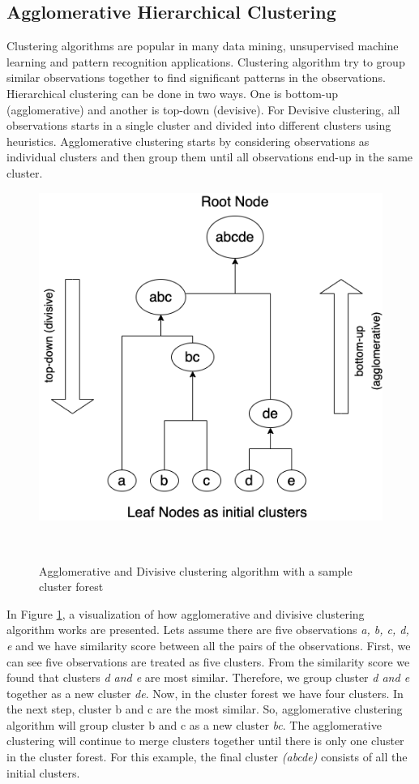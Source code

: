 \subsection{Agglomerative Hierarchical Clustering}
Clustering algorithms are popular in many data mining, unsupervised machine learning and pattern recognition applications. Clustering algorithm try to group similar observations together to find significant patterns in the observations. Hierarchical clustering can be done in two ways. One is bottom-up (agglomerative) and another is top-down (devisive). For Devisive clustering, all observations starts in a single cluster and divided into different clusters using heuristics. Agglomerative clustering starts by considering observations as individual clusters and then group them until all observations end-up in the same cluster.

\begin{figure}[h]
  \centering
  \includegraphics[width=0.5\columnwidth, height=0.5\columnwidth]{figures/background/agglomerative_clustering.png}
  \caption{Agglomerative and Divisive clustering algorithm with a sample cluster forest}~\label{fig:agglomerative_clustering}
\end{figure}
In Figure \ref{fig:agglomerative_clustering}, a visualization of how agglomerative and divisive clustering algorithm works are presented. Lets assume there are five observations \emph{a, b, c, d, e} and we have similarity score between all the pairs of the observations. First, we can see five observations are treated as five clusters. From the similarity score we found that clusters \emph{d and e} are most similar. Therefore, we group cluster \emph{d and e} together as a new cluster \emph{de}. Now, in the cluster forest we have four clusters. In the next step, cluster b and c are the most similar. So, agglomerative clustering algorithm will group cluster b and c as a new cluster \emph{bc}. The agglomerative clustering will continue to merge clusters together until there is only one cluster in the cluster forest. For this example, the final cluster \emph{(abcde)} consists of all the initial clusters. 

